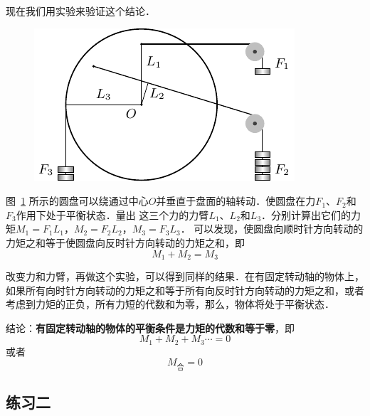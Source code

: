 现在我们用实验来验证这个结论．
\begin{figure}[htbp]
    \centering
    \includegraphics{fig/A/6-8.pdf}
    \caption{}\label{fig_A_6-8}
\end{figure}

图~\ref{fig_A_6-8} 所示的圆盘可以绕通过中心$O$并垂直于盘面的轴转动．使圆盘在力$F_1$、$F_2$和$F_3$作用下处于平衡状态．量出
这三个力的力臂$L_1$、$L_2$和$L_3$．分别计算出它们的力矩$M_1 =F_1 L_1$，$M_2 =F_2 L_2$，$M_3 =F_3 L_3$．
可以发现，使圆盘向顺时针方向转动的力矩之和等于使圆盘向反时针方向转动的力矩之和，即
\[M_1+M_2=M_3\]

改变力和力臂，再做这个实验，可以得到同样的结果．在有固定转动轴的物体上，如果所有向时针方向转动的力矩之和等于所有向反时针方向转动的力矩之和，或者考虑到力矩的正负，所有力短的代数和为零，那么，物体将处于平衡状态．

结论：\textbf{有固定转动轴的物体的平衡条件是力矩的代数和等于零}，即
\[M_1+M_2+M_3\cdots=0 \]
或者
\[M_{\text{合}}=0\]

\subsection*{练习二}

